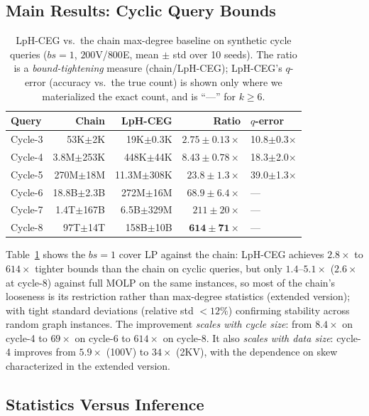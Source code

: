 \documentclass[sigconf, nonacm, acmthm=false]{acmart}
\begin{document}
\subsection{Main Results: Cyclic Query Bounds}

\begin{table}[t]
\centering
\caption{LpH-CEG vs.\ the chain max-degree baseline on synthetic cycle queries ($bs{=}1$,
$200$V/$800$E, mean $\pm$ std over 10 seeds).
The ratio is a \emph{bound-tightening} measure (chain/LpH-CEG);
LpH-CEG's $q$-error (accuracy vs.\ the true count) is shown only where we
materialized the exact count, and is ``---'' for $k \ge 6$.}
\label{tab:synthetic}
\begin{tabular}{@{}lrrrl@{}}
\toprule
Query & Chain & LpH-CEG & Ratio & $q$-error \\
\midrule
Cycle-3 &  53K$\pm$2K  &  19K$\pm$0.3K & $2.75{\pm}0.13\times$ & 10.8$\pm$0.3$\times$ \\
Cycle-4 & 3.8M$\pm$253K & 448K$\pm$44K & $8.43{\pm}0.78\times$ & 18.3$\pm$2.0$\times$ \\
Cycle-5 & 270M$\pm$18M  & 11.3M$\pm$308K & $23.8{\pm}1.3\times$ & 39.0$\pm$1.3$\times$ \\
Cycle-6 & 18.8B$\pm$2.3B & 272M$\pm$16M & $68.9{\pm}6.4\times$ & --- \\
Cycle-7 & 1.4T$\pm$167B & 6.5B$\pm$329M & $211{\pm}20\times$ & --- \\
Cycle-8 & 97T$\pm$14T  & 158B$\pm$10B & $\mathbf{614{\pm}71\times}$ & --- \\
\bottomrule
\end{tabular}
\end{table}

Table~\ref{tab:synthetic} shows the $bs{=}1$ cover LP against the chain: LpH-CEG achieves
$2.8\times$ to $614\times$ tighter bounds than the chain on cyclic
queries, but only $1.4$--$5.1\times$ ($2.6\times$ at cycle-$8$) against full MOLP on the same instances, so most of the chain's looseness is its restriction rather than max-degree statistics (extended version); with tight standard deviations (relative std $< 12\%$)
confirming stability across random graph instances.
The improvement \emph{scales with cycle size}: from $8.4\times$
on cycle-4 to $69\times$ on cycle-6 to $614\times$ on cycle-8.
It also \emph{scales with data size}: cycle-4 improves from $5.9\times$
(100V) to $34\times$ (2KV), with the dependence on skew characterized in the extended version.

\subsection{Statistics Versus Inference}
\label{sec:stats-vs-inference}
\end{document}
